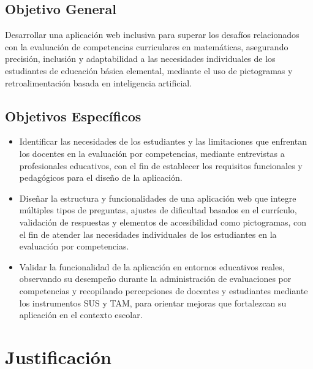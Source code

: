 \subsection{Objetivo General}

Desarrollar una aplicación web inclusiva para superar los desafíos relacionados con la evaluación de competencias curriculares en matemáticas, asegurando precisión, inclusión y adaptabilidad a las necesidades individuales de los estudiantes de educación básica elemental, mediante el uso de pictogramas y retroalimentación basada en inteligencia artificial.

\subsection{Objetivos Específicos}

\begin{itemize}[leftmargin=*]
\item Identificar las necesidades de los estudiantes y las limitaciones que enfrentan los docentes en la evaluación por competencias, mediante entrevistas a profesionales educativos, con el fin de establecer los requisitos funcionales y pedagógicos para el diseño de la aplicación.
\item Diseñar la estructura y funcionalidades de una aplicación web que integre múltiples tipos de preguntas, ajustes de dificultad basados en el currículo, validación de respuestas y elementos de accesibilidad como pictogramas, con el fin de atender las necesidades individuales de los estudiantes en la evaluación por competencias.
\item Validar la funcionalidad de la aplicación en entornos educativos reales, observando su desempeño durante la administración de evaluaciones por competencias y recopilando percepciones de docentes y estudiantes mediante los instrumentos SUS y TAM, para orientar mejoras que fortalezcan su aplicación en el contexto escolar.
\end{itemize}

\section{Justificación}

